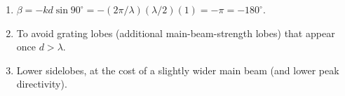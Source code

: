 \begin{enumerate}[leftmargin=1.6em,itemsep=2pt]
\item $\beta = -kd\sin90^\circ = -(2\pi/\lambda)(\lambda/2)(1) = -\pi = -180^\circ$.
\item To avoid grating lobes (additional main-beam-strength lobes) that appear once $d > \lambda$.
\item Lower sidelobes, at the cost of a slightly wider main beam (and lower peak directivity).
\end{enumerate}
